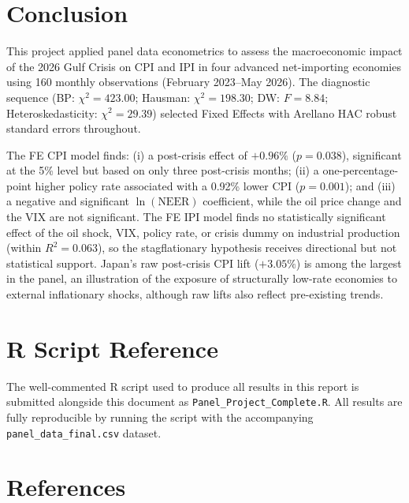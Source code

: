 \documentclass[11pt,a4paper]{article}
\let\oldsection\section
\renewcommand{\section}{\Needspace{6\baselineskip}\oldsection}
\begin{document}
\section{Conclusion}
This project applied panel data econometrics to assess the macroeconomic impact of the 2026 Gulf Crisis on CPI and IPI in four advanced net-importing economies using 160 monthly observations (February 2023--May 2026). The diagnostic sequence (BP: $\chi^2=423.00$; Hausman: $\chi^2=198.30$; DW: $F=8.84$; Heteroskedasticity: $\chi^2=29.39$) selected Fixed Effects with Arellano HAC robust standard errors throughout.

The FE CPI model finds: (i) a post-crisis effect of $+0.96\%$ ($p=0.038$), significant at the 5\% level but based on only three post-crisis months; (ii) a one-percentage-point higher policy rate associated with a 0.92\% lower CPI ($p=0.001$); and (iii) a negative and significant $\ln(\text{NEER})$ coefficient, while the oil price change and the VIX are not significant. The FE IPI model finds no statistically significant effect of the oil shock, VIX, policy rate, or crisis dummy on industrial production (within $R^2=0.063$), so the stagflationary hypothesis receives directional but not statistical support. Japan's raw post-crisis CPI lift ($+3.05\%$) is among the largest in the panel, an illustration of the exposure of structurally low-rate economies to external inflationary shocks, although raw lifts also reflect pre-existing trends.

\section{R Script Reference}
The well-commented R script used to produce all results in this report is submitted alongside this document as \texttt{Panel\_Project\_Complete.R}. All results are fully reproducible by running the script with the accompanying \texttt{panel\_data\_final.csv} dataset.

\section*{References}
\end{document}
